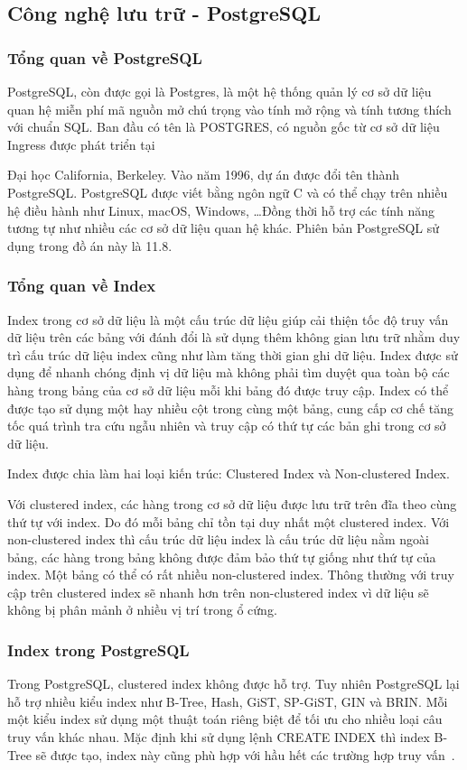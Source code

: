 \subsection{Công nghệ lưu trữ - PostgreSQL}

\subsubsection{Tổng quan về PostgreSQL}
PostgreSQL, còn được gọi là Postgres, là một hệ thống quản lý cơ sở 
dữ liệu quan hệ miễn phí mã nguồn mở chú trọng vào tính mở rộng và 
tính tương thích với chuẩn SQL. Ban đầu có tên là POSTGRES, có nguồn
gốc từ cơ sở dữ liệu Ingress được phát triển tại

Đại học California, Berkeley. Vào năm 1996, dự án được đổi tên thành
PostgreSQL. PostgreSQL được viết bằng ngôn ngữ C và có thể chạy trên nhiều
hệ điều hành như Linux, macOS, Windows, \ldots Đồng thời hỗ trợ các tính
năng tương tự như nhiều các cơ sở dữ liệu quan hệ khác.
Phiên bản PostgreSQL sử dụng trong đồ án này là 11.8.

\subsubsection{Tổng quan về Index}
Index trong cơ sở dữ liệu là một cấu trúc dữ liệu giúp cải thiện
tốc độ truy vấn dữ liệu trên các bảng với đánh đổi là sử dụng thêm
không gian lưu trữ nhằm duy trì cấu trúc dữ liệu index cũng như
làm tăng thời gian ghi dữ liệu. Index được sử dụng để nhanh chóng
định vị dữ liệu mà không phải tìm duyệt qua toàn bộ các hàng trong
bảng của cơ sở dữ liệu mỗi khi bảng đó được truy cập. Index có thể
được tạo sử dụng một hay nhiều cột trong cùng một bảng, cung cấp
cơ chế tăng tốc quá trình tra cứu ngẫu nhiên và truy cập có thứ
tự các bản ghi trong cơ sở dữ liệu. 

Index được chia làm hai loại kiến trúc:
Clustered Index và Non-clustered Index.

Với clustered index, các hàng trong cơ sở dữ liệu được lưu trữ
trên đĩa theo cùng thứ tự với index. Do đó mỗi bảng chỉ tồn tại
duy nhất một clustered index. Với non-clustered index thì cấu trúc dữ
liệu index là cấu trúc dữ liệu nằm ngoài bảng, các hàng trong bảng
không được đảm bảo thứ tự giống như thứ tự của index. Một bảng có
thể có rất nhiều non-clustered index. Thông thường với truy cập trên
clustered index sẽ nhanh hơn trên non-clustered index vì dữ liệu
sẽ không bị phân mảnh ở nhiều vị trí trong ổ cứng.

\subsubsection{Index trong PostgreSQL}
Trong PostgreSQL, clustered index không được hỗ trợ. Tuy nhiên
PostgreSQL lại hỗ trợ nhiều kiểu index như B-Tree, Hash, GiST,
SP-GiST, GIN và BRIN. Mỗi một kiểu index sử dụng một thuật toán
riêng biệt để tối ưu cho nhiều loại câu truy vấn khác nhau.
Mặc định khi sử dụng lệnh CREATE INDEX thì index B-Tree sẽ được tạo,
index này cũng phù hợp với hầu hết các
trường hợp truy vấn~\cite{postgresdocs:online}.


